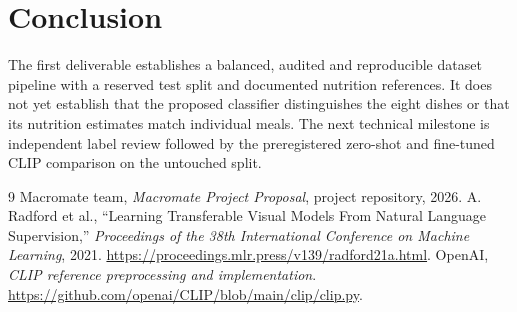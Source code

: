 \documentclass[11pt,a4paper]{article}
\begin{document}
\section{Conclusion}
The first deliverable establishes a balanced, audited and reproducible dataset pipeline with a reserved test split and documented nutrition references. It does not yet establish that the proposed classifier distinguishes the eight dishes or that its nutrition estimates match individual meals. The next technical milestone is independent label review followed by the preregistered zero-shot and fine-tuned CLIP comparison on the untouched split.

\begin{thebibliography}{9}
 Macromate team, \emph{Macromate Project Proposal}, project repository, 2026.
 A. Radford et al., ``Learning Transferable Visual Models From Natural Language Supervision,'' \emph{Proceedings of the 38th International Conference on Machine Learning}, 2021. \url{https://proceedings.mlr.press/v139/radford21a.html}.
 OpenAI, \emph{CLIP reference preprocessing and implementation}. \url{https://github.com/openai/CLIP/blob/main/clip/clip.py}.
\end{thebibliography}
\end{document}
